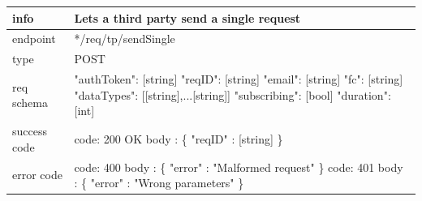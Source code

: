\documentclass[titlepage]{article}
\begin{document}
\begin{tabularx}{\textwidth}{lX} \hline
    info & Lets a third party send a single request \\ \hline
    endpoint & */req/tp/sendSingle \\ \hline
    type & POST \\ \hline
    req schema & 
    "authToken": [string] \newline
    "reqID": [string] \newline
    "email": [string] \newline
    "fc": [string] \newline
    "dataTypes": [[string],...[string]] \newline
    "subscribing": [bool] \newline
    "duration": [int] \\ \hline
    success code &
        code: 200 OK \newline \newline 
        body : \{ \newline
        "reqID" : [string] \newline
        \} \\ \hline
    error code &
        code: 400 \newline
        body : \{ "error" : "Malformed request" \} \newline \newline
        code: 401 \newline
        body : \{ "error" : "Wrong parameters" \}\\ \hline
\end{tabularx}
		
\vspace{\baselineskip}
\end{document}
